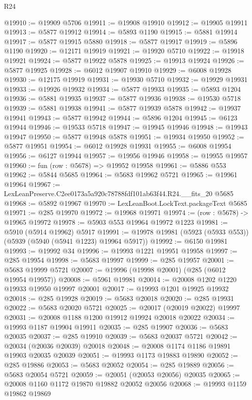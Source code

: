 \begin{lexlean}{R24}
\begin{coremodule}
@19910 := @19909 @5706
@19911 := @19908 @19910
@19912 := @19905 @19911
@19913 := @5877 @19912
@19914 := @5893 @1190
@19915 := @5881 @19914
@19917 := @5877 @19915 @5880
@19918 := @5877 @19917
@19919 := @5896 @1190
@19920 := @12171 @19919
@19921 := @19920 @5710
@19922 := @19918 @19921
@19924 := @5877 @19922 @5878
@19925 := @19913 @19924
@19926 := @5877 @19925
@19928 := @6012 @19907 @19910
@19929 := @6008 @19928
@19930 := @12175 @19919
@19931 := @19930 @5710
@19932 := @19929 @19931
@19933 := @19926 @19932
@19934 := @5877 @19933
@19935 := @5893 @1204
@19936 := @5881 @19935
@19937 := @5877 @19936
@19938 := @19530 @5718
@19939 := @5881 @19938
@19941 := @5877 @19939 @5878
@19942 := @19937 @19941
@19943 := @5877 @19942
@19944 := @5896 @1204
@19945 := @6123 @19944
@19946 := @19533 @5718
@19947 := @19945 @19946
@19948 := @19943 @19947
@19950 := @5877 @19948 @5878
@19951 := @19934 @19950
@19952 := @5877 @19951
@19954 := @6012 @19928 @19931
@19955 := @6008 @19954
@19956 := @6127 @19944
@19957 := @19956 @19946
@19958 := @19955 @19957
@19960 := fun (row : @5678) => @19952 @19958
@19961 := @5886 @553
@19962 := @5844 @5685
@19964 := @5683 @19962 @5721
@19965 := @19961 @19964
@19967 := LexLeanPreserve.C2ee0173a5a920c78788fdf101ab63f44.R24.__fits_20 @5685
@19968 := @5892 @19967
@19970 := LexLeanBoot.LockText.packageText @5685
@19971 := @285 @19970
@19972 := @19968 @19971
@19974 := (row : @5678) -> @19965 @19972
@19978 := @5903 @553 @19964 @19972 @1223
@19981 := @5910 (@5914 @19962) @5917
@19991 := @19978 @19981 (@5923 (@5933 @553)) (@5939 (@5940 (@5941 @1223) @19964 @5917))
@19992 := @6150 @19981
@19993 := @19992 @34
@19996 := @19993 @1221 @19951 @19958
@19997 := @285 @19954
@19998 := @5683 @19997
@19999 := @285 @19957
@20001 := @5683 @19999 @5721
@20007 := @19996 (@19998 @20001) (@285 (@6012 @19954 @19957))
@20008 := @5961 @19981
@20014 := @20008 @1202 @1220 @19933 @19950 @19997 @20001
@20017 := @19993 @1201 @19925 @19932
@20018 := @285 @19928
@20019 := @5683 @20018
@20020 := @285 @19931
@20022 := @5683 @20020 @5721
@20025 := @20017 (@20019 @20022) @19997
@20031 := @20008 @1188 @1200 @19912 @19924 @20018 @20022
@20034 := @19993 @1187 @19904 @19911
@20035 := @285 @19907
@20036 := @5683 @20035
@20037 := @285 @19910
@20039 := @5683 @20037 @5721
@20042 := @20034 (@20036 @20039) @20018
@20048 := @20008 @1174 @1186 @19891 @19903 @20035 @20039
@20051 := @19993 @1173 @19883 @19890
@20052 := @285 @19886
@20053 := @5683 @20052
@20054 := @285 @19889
@20056 := @5683 @20054 @5721
@20059 := @20051 (@20053 @20056) @20035
@20065 := @20008 @1160 @1172 @19870 @19882 @20052 @20056
@20068 := @19993 @1159 @19862 @19869

\end{coremodule}
\end{lexlean}
